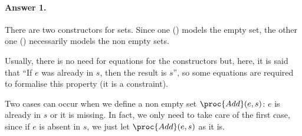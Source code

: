 \paragraph{Answer 1.} There are two constructors for sets. Since one
() models the empty set, the other one ()
necessarily models the non empty sets.

   Usually, there is no need for equations for the constructors but,
   here, it is said that ``If \(e\) was already in \(s\), then the
   result is \(s\)'', so some equations are required to formalise
   this property (it is a constraint).

   Two cases can occur when we define a non empty set \(\proc{Add}
   (e, s)\): \(e\) is already in \(s\) or it is
   missing. In fact, we only need to take care of the first case,
   since if \(e\) is absent in \(s\), we just let \(\proc{Add}
   (e, s)\) as it is.

